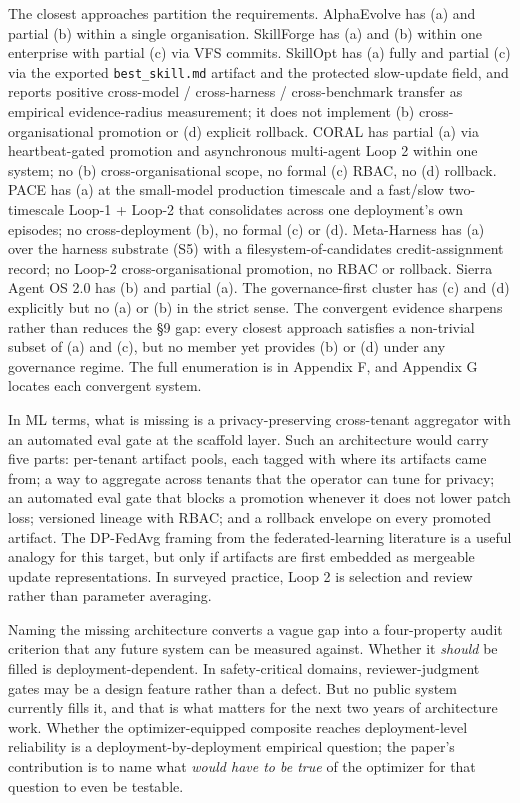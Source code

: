 The closest approaches partition the requirements. AlphaEvolve has (a)
and partial (b) within a single organisation. SkillForge has (a) and (b)
within one enterprise with partial (c) via VFS commits. SkillOpt has (a)
fully and partial (c) via the exported \texttt{best\_skill.md} artifact
and the protected slow-update field, and reports positive cross-model /
cross-harness / cross-benchmark transfer as empirical evidence-radius
measurement; it does not implement (b) cross-organisational promotion or
(d) explicit rollback. CORAL \citep{qu2026coral} has partial (a) via
heartbeat-gated promotion and asynchronous multi-agent Loop 2 within one
system; no (b) cross-organisational scope, no formal (c) RBAC, no (d)
rollback. PACE \citep{ling2026pace} has (a) at the small-model
production timescale and a fast/slow two-timescale Loop-1 + Loop-2 that
consolidates across one deployment's own episodes; no cross-deployment
(b), no formal (c) or (d). Meta-Harness \citep{lee2026metaharness} has
(a) over the harness substrate (S5) with a filesystem-of-candidates
credit-assignment record; no Loop-2 cross-organisational promotion, no
RBAC or rollback. Sierra Agent OS 2.0 has (b) and partial (a). The
governance-first cluster has (c) and (d) explicitly but no (a) or (b) in
the strict sense. The convergent evidence sharpens rather than reduces
the §9 gap: every closest approach satisfies a non-trivial subset of (a)
and (c), but no member yet provides (b) or (d) under any governance
regime. The full enumeration is in Appendix F, and Appendix G locates
each convergent system.

In ML terms, what is missing is a privacy-preserving cross-tenant
aggregator with an automated eval gate at the scaffold layer. Such an
architecture would carry five parts: per-tenant artifact pools, each
tagged with where its artifacts came from; a way to aggregate across
tenants that the operator can tune for privacy; an automated eval gate
that blocks a promotion whenever it does not lower patch loss; versioned
lineage with RBAC; and a rollback envelope on every promoted artifact.
The DP-FedAvg framing from the federated-learning literature is a useful
analogy for this target, but only if artifacts are first embedded as
mergeable update representations. In surveyed practice, Loop 2 is
selection and review rather than parameter averaging.

Naming the missing architecture converts a vague gap into a
four-property audit criterion that any future system can be measured
against. Whether it \emph{should} be filled is deployment-dependent. In
safety-critical domains, reviewer-judgment gates may be a design feature
rather than a defect. But no public system currently fills it, and that
is what matters for the next two years of architecture work. Whether the
optimizer-equipped composite reaches deployment-level reliability is a
deployment-by-deployment empirical question; the paper's contribution is
to name what \emph{would have to be true} of the optimizer for that
question to even be testable.

